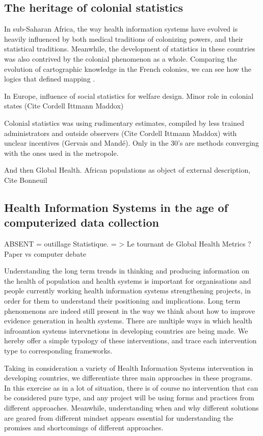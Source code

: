 \subsection{The heritage of colonial statistics}

In sub-Saharan Africa, the way health information systems have evolved is heavily influenced by both medical traditions of colonizing powers, and their statistical traditions. Meanwhile, the development of statistics in these countries was also contrived by the colonial phenomenon as a whole. Comparing the evolution of cartographic knowledge in the French colonies, we can see how the logics that defined mapping \cite{appadurai_number_1996}.

In Europe, influence of social statistics for welfare design. Minor role in colonial states (Cite Cordell Ittmann  Maddox)

Colonial statistics was using rudimentary estimates, compiled by less trained administrators and outside observers (Cite Cordell Ittmann  Maddox) with unclear incentives (Gervais and Mandé). Only in the 30's are methods converging with the ones used in the metropole.

And then Global Health. African populations as object of external description, Cite Bonneuil

\subsection{Health Information Systems in the age of computerized data collection}

ABSENT = outillage Statistique. = > Le tournant de Global Health Metrics ?
Paper vs computer debate



Understanding the long term trends in thinking and producing information on the health of population and health systems is important for organisations and people currently working health information systems strengthening projects, in order for them to understand their positioning and implications. Long term phenomenons are indeed still present in the way we think about how to improve evidence generation in health systems. There are multiple ways in which health infroamtion systems intervnetions in developing countries are being made. We hereby offer a simple typology of these interventions, and trace each intervention type to corresponding frameworks.

Taking in consideration a variety of Health Information Systems intervention in developing countries, we differentiate three main approaches in these programs. In this exercise as in a lot of situation, there is of course no intervention that can be considered pure type, and any project will be using forms and practices from different approaches. Meanwhile, understanding when and why different solutions are geared from different mindset appears essential for understanding the promises and shortcomings of different approaches.


